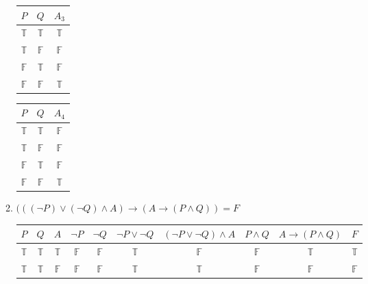 \documentclass[a4paper,12pt]{article}
\begin{document}
\begin{enumerate}
\begin{enumerate}
\begin{center}
\begin{table}[!htb]
\begin{minipage}{.2\linewidth}
\begin{tabular}{|c|c|c|}
$P$          & $Q$          & $A_3$        \\\hline
$\mathbb{T}$ & $\mathbb{T}$ & $\mathbb{T}$ \\
$\mathbb{T}$ & $\mathbb{F}$ & $\mathbb{F}$ \\
$\mathbb{F}$ & $\mathbb{T}$ & $\mathbb{F}$ \\
$\mathbb{F}$ & $\mathbb{F}$ & $\mathbb{T}$ \\\hline
\end{tabular}
    \end{minipage}%
    \begin{minipage}{.2\linewidth}
      \centering
        \begin{tabular}{|c|c|c|}\hline
$P$          & $Q$          & $A_4$        \\\hline
$\mathbb{T}$ & $\mathbb{T}$ & $\mathbb{F}$ \\
$\mathbb{T}$ & $\mathbb{F}$ & $\mathbb{F}$ \\
$\mathbb{F}$ & $\mathbb{T}$ & $\mathbb{F}$ \\
$\mathbb{F}$ & $\mathbb{F}$ & $\mathbb{T}$ \\\hline
\end{tabular}
    \end{minipage} 
\end{table}
\end{center}\newpage 
\item $(((\neg P)\lor(\neg Q)\land A)\rightarrow(A\rightarrow(P\land Q)) = F$
\begin{table}[htp]\centering
\begin{tabular}{|c|c|c|c|c|c|c|c|c|c|}\hline
$P$          & $Q$          & $A$          & $\neg P$     & $\neg Q$     & $\neg P\lor\neg Q$ & $(\neg P\lor\neg Q)\land A$ & $P\land Q$   & $A\rightarrow(P\land Q)$ & $F$ \\\hline
$\mathbb{T}$ & $\mathbb{T}$ & $\mathbb{T}$ & $\mathbb{F}$ & $\mathbb{F}$ & $\mathbb{T}$       & $\mathbb{F}$                & $\mathbb{F}$ & $\mathbb{T}$             & $\mathbb{T}$                                                                                                                                                           \\
$\mathbb{T}$ & $\mathbb{T}$ & $\mathbb{F}$ & $\mathbb{F}$ & $\mathbb{F}$ & $\mathbb{T}$       & $\mathbb{T}$                & $\mathbb{F}$ & $\mathbb{F}$             & \cellcolor[HTML]{FFCCC9}$\mathbb{F}$                                                                                                                                   \\

\end{tabular}
\end{table}
\end{enumerate}
\end{enumerate}
\end{document}
